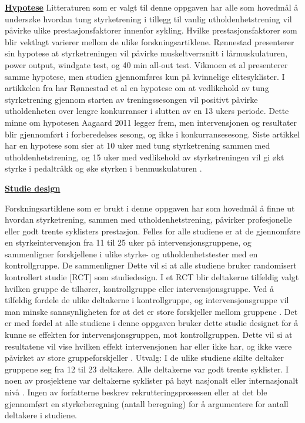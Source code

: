 \documentclass[
]{book}
\begin{document}
\underline{\textbf{Hypotese}} Litteraturen som er valgt til denne oppgaven har alle som hovedmål å undersøke hvordan tung styrketrening i tillegg til vanlig utholdenhetstrening vil påvirke ulike prestasjonsfaktorer innenfor sykling. Hvilke prestasjonsfaktorer som blir vektlagt varierer mellom de ulike forskningsartiklene. Rønnestad \citep{rønnestad2010b} presenterer sin hypotese at styrketreningen vil påvirke muskeltverrsnitt i lårmuskulaturen, power output, windgate test, og 40 min all-out test. Vikmoen et al \citep{vikmoen2016} presenterer samme hypotese, men studien gjennomføres kun på kvinnelige elitesyklister. I artikkelen fra \citep{rønnestad2010a} har Rønnestad et al en hypotese om at vedlikehold av tung styrketrening gjennom starten av treningssesongen vil positivt påvirke utholdenheten over lengre konkurranser i slutten av en 13 ukers periode. Dette minne om hypotesen Aagaard 2011 legger frem, men intervensjonen og resultater blir gjennomført i forberedelses sesong, og ikke i konkurransesesong. Siste artikkel har en hypotese som sier at 10 uker med tung styrketrening sammen med utholdenhetstrening, og 15 uker med vedlikehold av styrketreningen vil gi økt styrke i pedaltråkk og øke styrken i benmuskulaturen \citep{rønnestad2015}.

\underline{\textbf{Studie design}}

Forskningsartiklene som er brukt i denne oppgaven har som hovedmål å finne ut hvordan styrketrening, sammen med utholdenhetstrening, påvirker profesjonelle eller godt trente syklisters prestasjon. Felles for alle studiene er at de gjennomføre en styrkeintervensjon fra 11 til 25 uker på intervensjonsgruppene, og sammenligner forskjellene i ulike styrke- og utholdenhetstester med en kontrollgruppe. De sammenligner Dette vil si at alle studiene bruker randomisert kontrollert studie {[}RCT{]} som studiedesign. I et RCT blir deltakerne tilfeldig valgt hvilken gruppe de tilhører, kontrollgruppe eller intervensjonsgruppe. Ved å tilfeldig fordele de ulike deltakerne i kontrollgruppe, og intervensjonsgruppe vil man minske sannsynligheten for at det er store forskjeller mellom gruppene \citep{hulley2013, Parab2010}. Det er med fordel at alle studiene i denne oppgaven bruker dette studie designet for å kunne se effekten for intervensjonsgruppen, mot kontrollgruppen. Dette vil si at resultatene vil vise hvilken effekt intervensjonen har eller ikke har, og ikke være påvirket av store gruppeforskjeller \citep{helsebiblioteketuå} . Utvalg: I de ulike studiene skilte deltaker gruppene seg fra 12 til 23 deltakere. Alle deltakerne var godt trente syklister. I noen av prosjektene var deltakerne syklister på høyt nasjonalt eller internasjonalt nivå \citep{rønnestad2010a, rønnestad2010b, rønnestad2015, aagaard2011}. Ingen av forfatterne beskrev rekrutteringsprosessen eller at det ble gjennomført en styrkeberegning (antall beregning) for å argumentere for antall deltakere i studiene.
\end{document}
